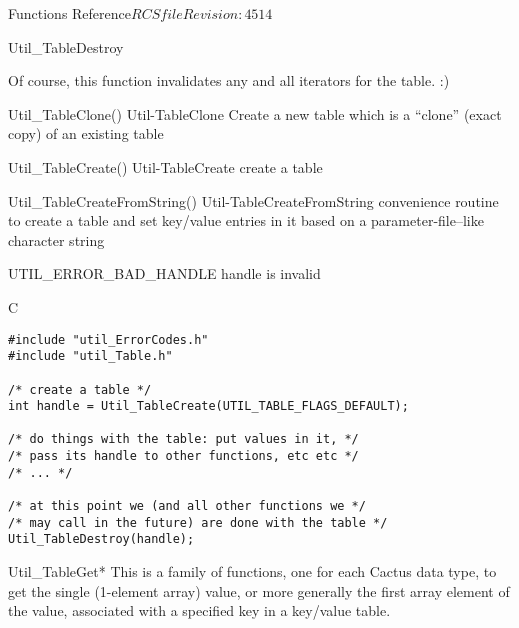 \begin{cactuspart}{ Functions Reference}{$RCSfile$}{$Revision: 4514 $}
\begin{FunctionDescription}{Util\_TableDestroy}
\begin{Discussion}
Of course, this function invalidates any and all iterators for the table. :)
\end{Discussion}

\begin{SeeAlsoSection}
\begin{SeeAlso2} {Util\_TableClone()} {Util-TableClone}
Create a new table which is a ``clone'' (exact copy) of an existing
table
\end{SeeAlso2}
\begin{SeeAlso2} {Util\_TableCreate()} {Util-TableCreate}
create a table
\end{SeeAlso2}
\begin{SeeAlso2} {Util\_TableCreateFromString()} {Util-TableCreateFromString}
convenience routine to create a table and set key/value entries
in it based on a parameter-file--like character string
\end{SeeAlso2}
\end{SeeAlsoSection}

\begin{ErrorSection}
\begin{Error}{UTIL\_ERROR\_BAD\_HANDLE}
handle is invalid
\end{Error}
\end{ErrorSection}

\begin{ExampleSection}
\begin{Example}{C}
\begin{verbatim}
#include "util_ErrorCodes.h"
#include "util_Table.h"

/* create a table */
int handle = Util_TableCreate(UTIL_TABLE_FLAGS_DEFAULT);

/* do things with the table: put values in it, */
/* pass its handle to other functions, etc etc */
/* ... */

/* at this point we (and all other functions we */
/* may call in the future) are done with the table */
Util_TableDestroy(handle);
\end{verbatim}
\end{Example}
\end{ExampleSection}
\end{FunctionDescription}


\begin{FunctionDescription}{Util\_TableGet*}
\label{Util-TableGet*}
This is a family of functions, one for each Cactus data type,
to get the single (1-element array) value, or more generally the
first array element of the value, associated with a specified key
in a key/value table.


\end{FunctionDescription}
\end{cactuspart}
